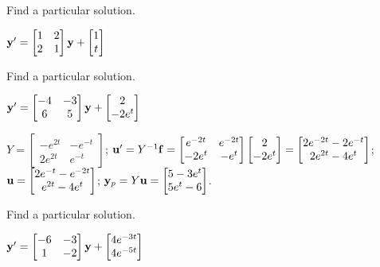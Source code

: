 \documentclass{ximera}
\begin{document}
 \begin{problem}\label{exer:10.7.3}
 Find a particular solution.
 
 $ {\bf y}'=\begin{bmatrix}1&2\\2&1\end{bmatrix}{\bf
y}+\begin{bmatrix}1\\t\end{bmatrix}$
\end{problem}

 \begin{problem}\label{exer:10.7.4}
 Find a particular solution.
 
 $ {\bf y}'=\begin{bmatrix}-4&-3\\6&5\end{bmatrix}{\bf
y}+\begin{bmatrix}2\\-2e^t\end{bmatrix}$

\begin{solution}
    $Y=\begin{bmatrix}
-e^{2t}&-e^{-t}\\2e^{2t}&e^{-t}\end{bmatrix}$;
${\bf u}'=Y^{-1}{\bf f}=
\begin{bmatrix}e^{-2t}&e^{-2t}\\
-2e^t&-e^t\end{bmatrix}
\begin{bmatrix}2\\-2e^t\end{bmatrix}=
\begin{bmatrix}2e^{-2t}-2e^{-t}\\2e^{2t}-4e^t\end{bmatrix}$;
${\bf u}=
\begin{bmatrix}2e^{-t}-e^{-2t}\\
e^{2t}-4e^t\end{bmatrix}$;
${\bf y}_p=Y{\bf u}=
\begin{bmatrix}5-3e^t\\5e^t-6\end{bmatrix}$.
\end{solution}
 \end{problem}


 \begin{problem}\label{exer:10.7.5}
 Find a particular solution.
 
 $ {\bf y}'=\begin{bmatrix}-6&-3\\1&-2\end{bmatrix}{\bf
y}+\begin{bmatrix}4e^{-3t}\\4e^{-5t}\end{bmatrix}$
\end{problem}
\end{document}
